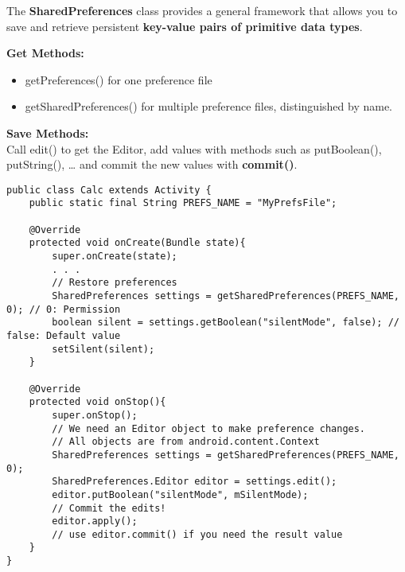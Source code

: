 \begin{breakbox}

The \textbf{SharedPreferences} class provides a general framework that
allows you to save and retrieve persistent \textbf{key-value pairs of
primitive data types}.

\textbf{Get Methods:}
\begin{itemize}
    \item getPreferences() for one preference file
    \item getSharedPreferences() for
multiple preference files, distinguished by name.
\end{itemize}

\textbf{Save Methods:} \\
Call edit() to get the Editor, add values with methods such as
putBoolean(), putString(), \ldots{} and commit the new values with
\textbf{commit()}.

\clearpage
\begin{lstlisting}
public class Calc extends Activity {
    public static final String PREFS_NAME = "MyPrefsFile";

    @Override
    protected void onCreate(Bundle state){
        super.onCreate(state);
        . . .
        // Restore preferences
        SharedPreferences settings = getSharedPreferences(PREFS_NAME, 0); // 0: Permission
        boolean silent = settings.getBoolean("silentMode", false); // false: Default value
        setSilent(silent);
    }

    @Override
    protected void onStop(){
        super.onStop();
        // We need an Editor object to make preference changes.
        // All objects are from android.content.Context
        SharedPreferences settings = getSharedPreferences(PREFS_NAME, 0);
        SharedPreferences.Editor editor = settings.edit();
        editor.putBoolean("silentMode", mSilentMode);
        // Commit the edits!
        editor.apply();
        // use editor.commit() if you need the result value
    }
}
\end{lstlisting}
\end{breakbox}

